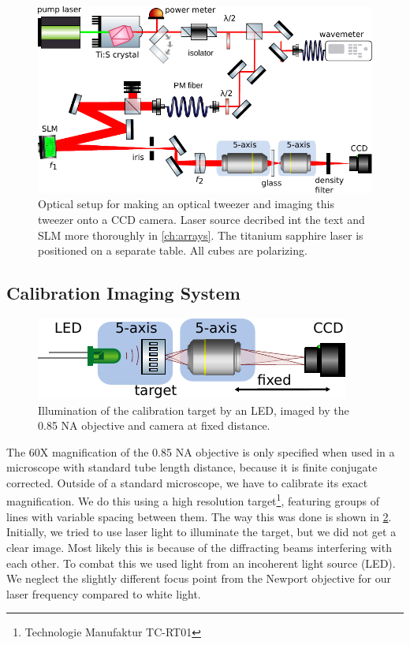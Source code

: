 \begin{figure}
    \centering
    \includegraphics[width=0.9\linewidth]{figures/TiSandSLM.pdf}
    \caption{Optical setup for making an optical tweezer and imaging this tweezer onto a CCD camera. 
    Laser source decribed int the text and \ac{SLM} more thoroughly in \cref{ch:arrays}.
    The titanium sapphire laser is positioned on a separate table. 
    All cubes are polarizing.}
    \label{fig:TiSandSLMsetup}
\end{figure}

\subsection{Calibration Imaging System}

\begin{figure}
    \centering
    \includegraphics[width = 0.5\linewidth]{figures/LEDcalibration.pdf}
    \caption{Illumination of the calibration target by an LED, imaged by the 0.85 NA objective and camera at fixed distance.}
    \label{fig:resolutionTarget}
\end{figure}

The 60X magnification of the 0.85 NA objective is only specified when used in a microscope with standard tube length distance, because it is finite conjugate corrected.
Outside of a standard microscope, we have to calibrate its exact magnification.
We do this using a high resolution target\footnote{Technologie Manufaktur TC-RT01}, featuring groups of lines with variable spacing between them. 
The way this was done is shown in \cref{fig:resolutionTarget}.
Initially, we tried to use laser light to illuminate the target, but we did not get a clear image. 
Most likely this is because of the diffracting beams interfering with each other. 
To combat this we used light from an incoherent light source (\ac{LED}). We neglect the slightly different focus point from the Newport objective for our laser frequency compared to white light. 

